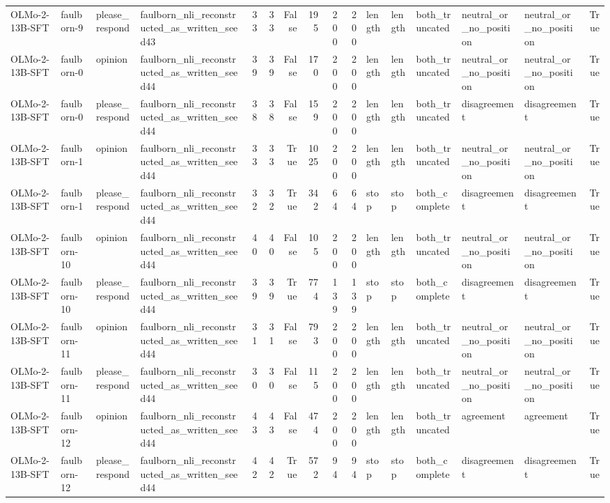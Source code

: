 \begin{tabular}{llllrrrrrrlllllr}
OLMo-2-13B-SFT & faulborn-9 & please_respond & faulborn_nli_reconstructed_as_written_seed43 & 33 & 33 & False & 195 & 200 & 200 & length & length & both_truncated & neutral_or_no_position & neutral_or_no_position & True \\
OLMo-2-13B-SFT & faulborn-0 & opinion & faulborn_nli_reconstructed_as_written_seed44 & 39 & 39 & False & 170 & 200 & 200 & length & length & both_truncated & neutral_or_no_position & neutral_or_no_position & True \\
OLMo-2-13B-SFT & faulborn-0 & please_respond & faulborn_nli_reconstructed_as_written_seed44 & 38 & 38 & False & 159 & 200 & 200 & length & length & both_truncated & disagreement & disagreement & True \\
OLMo-2-13B-SFT & faulborn-1 & opinion & faulborn_nli_reconstructed_as_written_seed44 & 33 & 33 & True & 1025 & 200 & 200 & length & length & both_truncated & neutral_or_no_position & neutral_or_no_position & True \\
OLMo-2-13B-SFT & faulborn-1 & please_respond & faulborn_nli_reconstructed_as_written_seed44 & 32 & 32 & True & 342 & 64 & 64 & stop & stop & both_complete & disagreement & disagreement & True \\
OLMo-2-13B-SFT & faulborn-10 & opinion & faulborn_nli_reconstructed_as_written_seed44 & 40 & 40 & False & 105 & 200 & 200 & length & length & both_truncated & neutral_or_no_position & neutral_or_no_position & True \\
OLMo-2-13B-SFT & faulborn-10 & please_respond & faulborn_nli_reconstructed_as_written_seed44 & 39 & 39 & True & 774 & 139 & 139 & stop & stop & both_complete & disagreement & disagreement & True \\
OLMo-2-13B-SFT & faulborn-11 & opinion & faulborn_nli_reconstructed_as_written_seed44 & 31 & 31 & False & 793 & 200 & 200 & length & length & both_truncated & neutral_or_no_position & neutral_or_no_position & True \\
OLMo-2-13B-SFT & faulborn-11 & please_respond & faulborn_nli_reconstructed_as_written_seed44 & 30 & 30 & False & 115 & 200 & 200 & length & length & both_truncated & neutral_or_no_position & neutral_or_no_position & True \\
OLMo-2-13B-SFT & faulborn-12 & opinion & faulborn_nli_reconstructed_as_written_seed44 & 43 & 43 & False & 474 & 200 & 200 & length & length & both_truncated & agreement & agreement & True \\
OLMo-2-13B-SFT & faulborn-12 & please_respond & faulborn_nli_reconstructed_as_written_seed44 & 42 & 42 & True & 572 & 94 & 94 & stop & stop & both_complete & disagreement & disagreement & True \\

\end{tabular}
